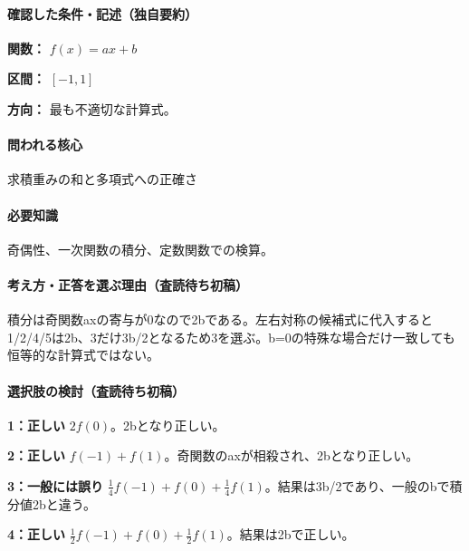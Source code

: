 \paragraph{確認した条件・記述（独自要約）}\mbox{}\par

\noindent\textbf{関数：} \(f(x)=ax+b\)\par

\noindent\textbf{区間：} \([-1,1]\)\par

\noindent\textbf{方向：} 最も不適切な計算式。\par

\paragraph{問われる核心} 求積重みの和と多項式への正確さ

\paragraph{必要知識} 奇偶性、一次関数の積分、定数関数での検算。

\paragraph{考え方・正答を選ぶ理由（査読待ち初稿）} 積分は奇関数axの寄与が0なので2bである。左右対称の候補式に代入すると1/2/4/5は2b、3だけ3b/2となるため3を選ぶ。b=\allowbreak{}0の特殊な場合だけ一致しても恒等的な計算式ではない。

\paragraph{選択肢の検討（査読待ち初稿）}\mbox{}\par

\noindent\textbf{1：正しい} \(2f(0)\)。2bとなり正しい。\par

\noindent\textbf{2：正しい} \(f(-1)+f(1)\)。奇関数のaxが相殺され、2bとなり正しい。\par

\noindent\textbf{3：一般には誤り} \(\frac14f(-1)+f(0)+\frac14f(1)\)。結果は3b/2であり、一般のbで積分値2bと違う。\par

\noindent\textbf{4：正しい} \(\frac12f(-1)+f(0)+\frac12f(1)\)。結果は2bで正しい。\par

